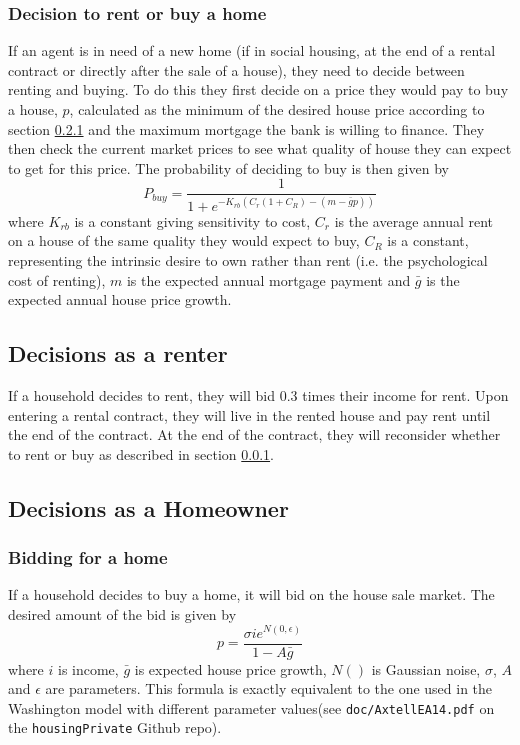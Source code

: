 \documentclass{report}
\begin{document}
\subsubsection{Decision to rent or buy a home}
\label{rentorbuy}
If an agent is in need of a new home (if in social housing, at the end of a rental contract or directly after the sale of a house), they need to decide between renting and buying. To do this they first decide on a price they would pay to buy a house, $p$, calculated as the minimum of the desired house price according to section \ref{buyahome} and the maximum mortgage the bank is willing to finance. They then check the current market prices to see what quality of house they can expect to get for this price. The probability of deciding to buy is then  given by
\begin{equation}
P_{buy} = \frac{1}{1 + e^{-K_{rb}(C_{r}(1+C_R) - (m - \bar{g}p))}}
\end{equation}
where $K_{rb}$ is a constant giving sensitivity to cost, $C_{r}$ is the average annual rent on a house of the same quality they would expect to buy, $C_R$ is a constant, representing the intrinsic desire to own rather than rent (i.e. the psychological cost of renting), $m$ is the expected annual mortgage payment and $\bar{g}$ is the expected annual house price growth.

\subsection{Decisions as a renter}
If a household decides to rent, they will bid 0.3 times their income for rent. Upon entering a rental contract, they will live in the rented house and pay rent until the end of the contract. At the end of the contract, they will reconsider whether to rent or buy as described in section \ref{rentorbuy}.

\subsection{Decisions as a Homeowner}

\subsubsection{Bidding for a home}
\label{buyahome}
If a household decides to buy a home, it will bid on the house sale market. The desired amount of the bid is given by
\begin{equation}
p = \frac{\sigma i e^{N(0,\epsilon)}}{1 - A\bar{g}}
\end{equation}
where $i$ is income, $\bar{g}$ is expected house price growth, $N()$ is Gaussian noise, $\sigma$, $A$ and $\epsilon$ are parameters. This formula is exactly equivalent to the one used in the Washington model with different parameter values(see \texttt{doc/AxtellEA14.pdf} on the \texttt{housingPrivate} Github repo).
\end{document}
